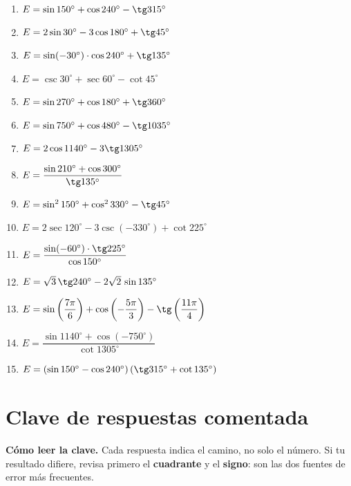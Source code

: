 \documentclass[12pt, letterpaper]{article}
\providecommand{\sen}{\sin}
\begin{document}
\begin{enumerate}[leftmargin=*, label=\textbf{\arabic*.}, start=33]
  \item $E=\sen 150^\circ+\cos 240^\circ-\tg 315^\circ$
  \item $E=2\sen 30^\circ-3\cos 180^\circ+\tg 45^\circ$
  \item $E=\sen(-30^\circ)\cdot\cos 240^\circ+\tg 135^\circ$
  \item $E=\csc 30^\circ+\sec 60^\circ-\cot 45^\circ$
  \item $E=\sen 270^\circ+\cos 180^\circ+\tg 360^\circ$
  \item $E=\sen 750^\circ+\cos 480^\circ-\tg 1035^\circ$
  \item $E=2\cos 1140^\circ-3\tg 1305^\circ$
  \item $E=\dfrac{\sen 210^\circ+\cos 300^\circ}{\tg 135^\circ}$
  \item $E=\sen^2 150^\circ+\cos^2 330^\circ-\tg 45^\circ$
  \item $E=2\sec 120^\circ-3\csc(-330^\circ)+\cot 225^\circ$
  \item $E=\dfrac{\sen(-60^\circ)\cdot\tg 225^\circ}{\cos 150^\circ}$
  \item $E=\sqrt{3}\,\tg 240^\circ-2\sqrt{2}\,\sen 135^\circ$
  \item $E=\sen\left(\dfrac{7\pi}{6}\right)+\cos\left(-\dfrac{5\pi}{3}\right)-\tg\left(\dfrac{11\pi}{4}\right)$
  \item $E=\dfrac{\sen 1140^\circ+\cos(-750^\circ)}{\cot 1305^\circ}$
  \item $E=\left(\sen 150^\circ-\cos 240^\circ\right)\left(\tg 315^\circ+\cot 135^\circ\right)$
\end{enumerate}

\ifmwclaves
\clearpage
\section*{Clave de respuestas comentada}

\begin{cuadroinfo}
  \small
  \textbf{Cómo leer la clave.} Cada respuesta indica el camino, no solo el
  número. Si tu resultado difiere, revisa primero el \textbf{cuadrante} y el
  \textbf{signo}: son las dos fuentes de error más frecuentes.
\end{cuadroinfo}
\end{document}
